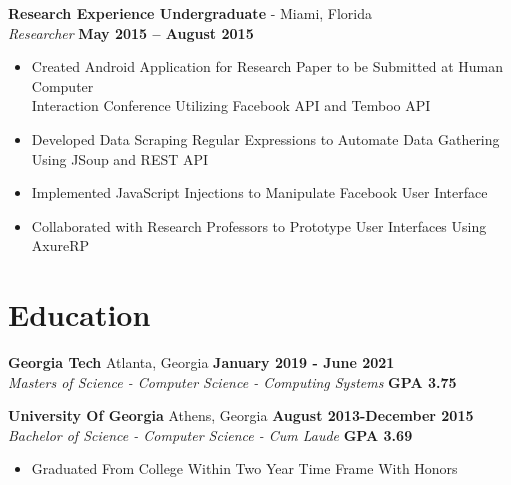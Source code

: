 \documentclass[margin,line]{resume}
\begin{document}
\begin{resume}
	\textbf{Research Experience Undergraduate} - Miami, Florida \vspace{1mm}\\\vspace{1mm}%
	\textsl{Researcher} \hfill \textbf{May 2015 -- August 2015}
	\begin{itemize}
		\item Created Android Application for Research Paper to be Submitted at Human Computer\\
		Interaction Conference Utilizing Facebook API and Temboo API
		\item Developed Data Scraping Regular Expressions to Automate Data Gathering Using JSoup and REST API
		\item Implemented JavaScript Injections to Manipulate Facebook User Interface
		\item Collaborated with Research Professors to Prototype User Interfaces Using AxureRP
	\end{itemize}
	
	
	\section{\mysidestyle Education}
	
	\textbf{Georgia Tech} Atlanta, Georgia \hfill \textbf{January 2019 - June 2021}\\
	\textsl{Masters of Science - Computer Science - Computing Systems} \hfill \textbf{GPA 3.75} \vspace{2mm}
	
	\textbf{University Of Georgia} Athens, Georgia \hfill \textbf{August 2013-December 2015} \\
	\textsl{Bachelor of Science - Computer Science - Cum Laude} \hfill \textbf{GPA 3.69}\vspace{2mm}
	\begin{itemize}
		\item Graduated From College Within Two Year Time Frame With Honors
	\end{itemize}

	\end{resume}
	
\end{document}
